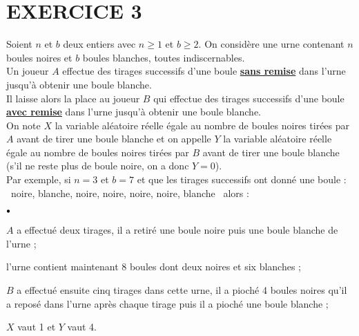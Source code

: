 \documentclass[11pt]{article}%
\begin{document}
\section*{EXERCICE 3}
\noindent Soient $n$ et $b$ deux entiers avec $n \geq 1$ et $b \geq 2$.
On considère une urne contenant $n$ boules noires et $b$ boules
blanches, toutes indiscernables. \vspace{0.5cm} \\
Un joueur $A$ effectue des tirages successifs d'une boule
\textbf{\underline{sans remise}} dans l'urne jusqu'à obtenir une boule
blanche. \\
Il laisse alors la place au joueur $B$ qui effectue des tirages
successifs d'une boule \textbf{\underline{avec remise}} dans l'urne
jusqu'à obtenir une boule blanche. \vspace{0.5cm} \\
On note $X$ la variable aléatoire réelle égale au nombre de boules
noires tirées par $A$ avant de tirer une boule blanche et on appelle
$Y$ la variable aléatoire réelle égale au nombre de boules noires
tirées par $B$ avant de tirer une boule blanche (s'il ne reste plus de
boule noire, on a donc $Y = 0$). \vspace{0.5cm} \\
Par exemple, si $n = 3$ et $b = 7$ et que les tirages successifs ont
donné une boule : \\
\og\ noire, blanche, noire, noire, noire, noire, blanche \fg\ alors :
\begin{noliste}{$\scriptstyle \bullet$}

\item $A$ a effectué deux tirages, il a retiré une boule noire puis une
boule blanche de l'urne ; 

\item l'urne contient maintenant 8 boules dont deux noires et six
blanches ; 

\item $B$ a effectué ensuite cinq tirages dans cette urne, il a pioché
4 boules noires qu'il a reposé dans l'urne après chaque tirage puis il
a pioché une boule blanche ;

\item $X$ vaut 1 et $Y$ vaut 4.

\end{noliste}
\end{document}
